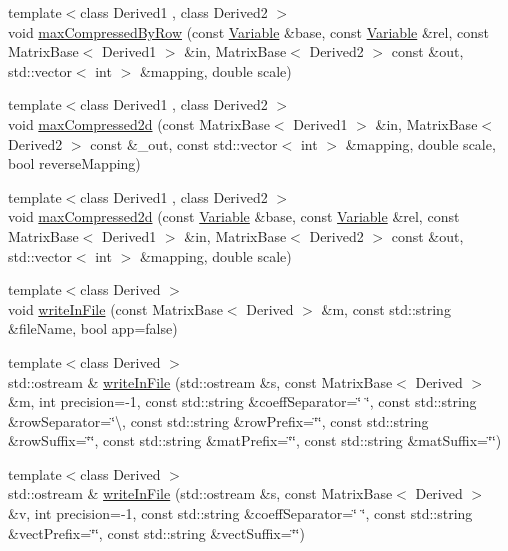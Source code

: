 \begin{DoxyCompactItemize}
\item 
{\footnotesize template$<$class Derived1 , class Derived2 $>$ }\\void \hyperlink{namespaceocra_1_1utils_a0d2b985e493c0d62782921b92d0f92a9}{max\+Compressed\+By\+Row} (const \hyperlink{classocra_1_1Variable}{Variable} \&base, const \hyperlink{classocra_1_1Variable}{Variable} \&rel, const Matrix\+Base$<$ Derived1 $>$ \&in, Matrix\+Base$<$ Derived2 $>$ const \&out, std\+::vector$<$ int $>$ \&mapping, double scale)
\item 
{\footnotesize template$<$class Derived1 , class Derived2 $>$ }\\void \hyperlink{namespaceocra_1_1utils_ac4a24bd4a452b6c09129dcf5b7f620a2}{max\+Compressed2d} (const Matrix\+Base$<$ Derived1 $>$ \&in, Matrix\+Base$<$ Derived2 $>$ const \&\+\_\+out, const std\+::vector$<$ int $>$ \&mapping, double scale, bool reverse\+Mapping)
\item 
{\footnotesize template$<$class Derived1 , class Derived2 $>$ }\\void \hyperlink{namespaceocra_1_1utils_ab1811bfb0b7d5ab451e9fea88093027e}{max\+Compressed2d} (const \hyperlink{classocra_1_1Variable}{Variable} \&base, const \hyperlink{classocra_1_1Variable}{Variable} \&rel, const Matrix\+Base$<$ Derived1 $>$ \&in, Matrix\+Base$<$ Derived2 $>$ const \&out, std\+::vector$<$ int $>$ \&mapping, double scale)
\item 
{\footnotesize template$<$class Derived $>$ }\\void \hyperlink{namespaceocra_1_1utils_a3f12986cd4d4a40293f6003d9a86a45c}{write\+In\+File} (const Matrix\+Base$<$ Derived $>$ \&m, const std\+::string \&file\+Name, bool app=false)
\item 
{\footnotesize template$<$class Derived $>$ }\\std\+::ostream \& \hyperlink{namespaceocra_1_1utils_ac3e209e5a700c28cc6e38d79113017f2}{write\+In\+File} (std\+::ostream \&s, const Matrix\+Base$<$ Derived $>$ \&m, int precision=-\/1, const std\+::string \&coeff\+Separator=\char`\"{} \char`\"{}, const std\+::string \&row\+Separator=\char`\"{}\textbackslash{}, const std\+::string \&row\+Prefix=\char`\"{}\char`\"{}, const std\+::string \&row\+Suffix=\char`\"{}\char`\"{}, const std\+::string \&mat\+Prefix=\char`\"{}\char`\"{}, const std\+::string \&mat\+Suffix=\char`\"{}\char`\"{})
\item 
{\footnotesize template$<$class Derived $>$ }\\std\+::ostream \& \hyperlink{namespaceocra_1_1utils_af94bc08a67cf20092611bb37f4528b28}{write\+In\+File} (std\+::ostream \&s, const Matrix\+Base$<$ Derived $>$ \&v, int precision=-\/1, const std\+::string \&coeff\+Separator=\char`\"{} \char`\"{}, const std\+::string \&vect\+Prefix=\char`\"{}\char`\"{}, const std\+::string \&vect\+Suffix=\char`\"{}\char`\"{})

\end{DoxyCompactItemize}
